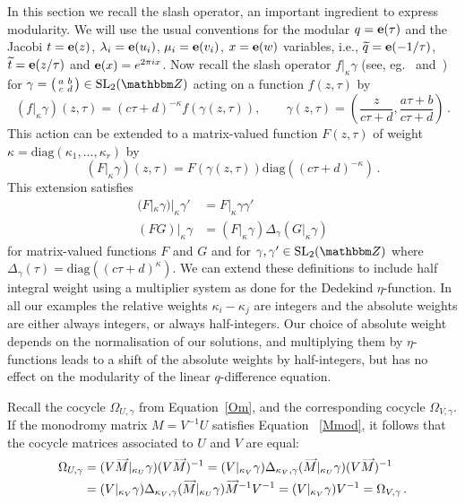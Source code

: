 \documentclass[12pt,reqno]{amsart}
\theoremstyle{definition}
\def\BZ{\mathbbm Z}
\def\ti{\widetilde}
\def\SL{\mathrm{SL}}
\def\be{\begin{equation}}
\def\ee{\end{equation}}
\def\e{\bold e}
\def\diag{\mathrm{diag}}
\def\Om{\Omega}
\def\sma#1#2#3#4{\bigl(\smallmatrix#1&#2\\#3&#4\endsmallmatrix\bigr)} %
\def\vM{\accentset{\longrightarrow}{M}}
\begin{document}
In this section we recall the slash operator, an important ingredient to
express modularity. We will use the usual conventions for the modular
$q=\e(\tau)$ and the Jacobi $t=\e(z)$, $\lambda_{i}=\e(u_{i})$, $\mu_{i}=\e(v_{i})$,
$x=\e(w)$ variables, i.e., $\ti q=\e(-1/\tau)$, $\ti t=\e(z/\tau)$ and
$\e(x)=e^{2\pi i x}$.
Now recall the slash operator $f|_\kappa \gamma$ (see, eg.~\cite[p.13]{123}
and~\cite{EZ}) for $\gamma=\sma abcd \in\SL_{2}(\BZ)$ acting on a function
$f(z,\tau)$ by 
\be
\label{fslash}
(f|_\kappa \gamma)(z,\tau) = (c \tau+d)^{-\kappa} f(\gamma(z,\tau)),
\qquad \gamma(z,\tau) = \left(\frac{z}{c\tau+d},\frac{a\tau+b}{c\tau+d}\right) \,.
\ee
This action can be extended to a matrix-valued
function $F(z,\tau)$ of weight $\kappa=\diag(\kappa_1,\dots,\kappa_r)$ by 
\be
\label{Fslash}
  (F|_\kappa\gamma)(z,\tau)
  =
  F(\gamma(z,\tau))%
 \diag((c \tau+d)^{-\kappa}) \,.
 \ee
 This extension satisfies
 \be
 \label{slashprops}
 \begin{aligned}
   (F|_\kappa\gamma)|_\kappa\gamma' &= F|_\kappa\gamma\gamma' \\
   (F G)|_\kappa\gamma &= (F|_\kappa\gamma) \Delta_\gamma
   (G|_\kappa\gamma) 
 \end{aligned}
 \ee
 for matrix-valued functions $F$ and $G$ and for $\gamma, \gamma' \in \SL_2(\BZ)$
 where $\Delta_\gamma(\tau)=\diag((c \tau+d)^{\kappa})$. We can extend these
 definitions to include half integral weight using a multiplier system as
 done for the Dedekind $\eta$-function. In all our examples the relative weights
 $\kappa_{i}-\kappa_{j}$ are integers and the absolute weights are either always
 integers, or always half-integers. Our choice of absolute weight depends on the
 normalisation of our solutions, and multiplying them by $\eta$-functions leads to
 a shift of the absolute weights by half-integers, but has no effect on the modularity
 of the linear $q$-difference equation. 

Recall the cocycle $\Om_{U,\gamma}$ from Equation~\eqref{Om}, and the corresponding
cocycle $\Om_{V,\gamma}$. If the monodromy matrix $M=V^{-1}U$ satisfies Equation
~\eqref{Mmod}, it follows that the cocycle matrices associated to $U$ and $V$
are equal:
\be
\label{WU=WV}
\begin{aligned}
  \Om_{U,\gamma} &=  (V\vM|_{\kappa_U}\gamma)(V\vM)^{-1}
  = (V|_{\kappa_{V}}\gamma) \Delta_{\kappa_V,\gamma}(\vM|_{\kappa_U}\gamma)(V\vM)^{-1}
  \\ &= (V|_{\kappa_V}\gamma)
  \Delta_{\kappa_V,\gamma}(\vM|_{\kappa_U}\gamma)\vM^{-1}V^{-1}
  = (V|_{\kappa_V}\gamma)V^{-1} = \Om_{V,\gamma} \,.
\end{aligned}
\ee
\end{document}
